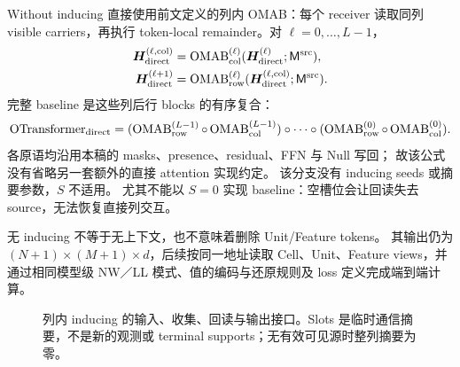 \documentclass[11pt,UTF8,fontset=fandol]{ctexart}
\numberwithin{equation}{section}
\theoremstyle{definition}
\newcommand{\OMAB}{\operatorname{OMAB}}
\newcommand{\OTransformer}{\operatorname{OTransformer}}
\begin{document}
Without inducing 直接使用前文定义的列内 OMAB：每个 receiver 读取同列 visible
carriers，再执行 token-local remainder。对 $\ell=0,\ldots,L-1$，
\begin{equation}
 \begin{aligned}
  \bm H_{\rm direct}^{(\ell,\mathrm{col})}
   &=\OMAB_{\mathrm{col}}^{(\ell)}
        (\bm H_{\rm direct}^{(\ell)};\mathsf M^{\mathrm{src}}),\\
  \bm H_{\rm direct}^{(\ell+1)}
   &=\OMAB_{\mathrm{row}}^{(\ell)}
        (\bm H_{\rm direct}^{(\ell,\mathrm{col})};\mathsf M^{\mathrm{src}}).
 \end{aligned}
 \label{eq:A:direct-baseline-block}
\end{equation}
完整 baseline 是这些列后行 blocks 的有序复合：
\begin{equation}
 \OTransformer_{\rm direct}
  =(\OMAB_{\rm row}^{(L-1)}\circ\OMAB_{\rm col}^{(L-1)})
    \circ\cdots\circ
    (\OMAB_{\rm row}^{(0)}\circ\OMAB_{\rm col}^{(0)}).
 \label{eq:A:direct-baseline-composition}
\end{equation}
各原语均沿用本稿的 masks、presence、residual、FFN 与 Null 写回；
故该公式没有省略另一套额外的直接 attention 实现约定。
该分支没有 inducing seeds 或摘要参数，$S$ 不适用。
尤其不能以 $S=0$ 实现 baseline：空槽位会让回读失去 source，无法恢复直接列交互。

无 inducing 不等于无上下文，也不意味着删除 Unit/Feature tokens。
其输出仍为 $(N+1)\times(M+1)\times d$，后续按同一地址读取 Cell、Unit、Feature
views，并通过相同模型级 NW／LL 模式、值的编码与还原规则及 loss 定义完成端到端计算。



\begin{figure}[htbp]\centering
{}
\caption{列内 inducing 的输入、收集、回读与输出接口。Slots 是临时通信摘要，不是新的观测或 terminal supports；无有效可见源时整列摘要为零。}
\label{fig:inducing-slots}\end{figure}
\end{document}

